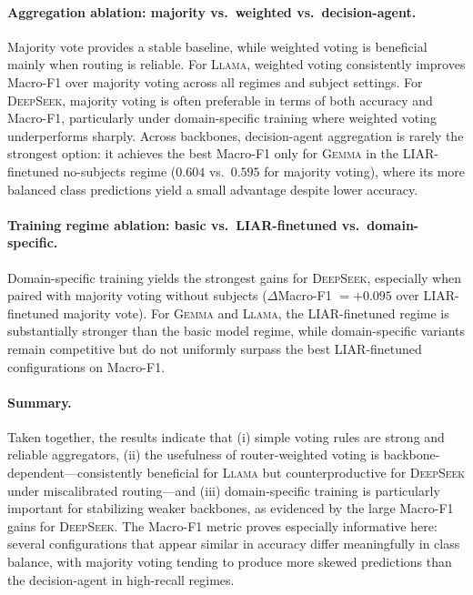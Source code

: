 \paragraph{Aggregation ablation: majority vs.\ weighted vs.\ decision-agent.}
Majority vote provides a stable baseline, while weighted voting is beneficial mainly when routing is reliable.
For \textsc{Llama}, weighted voting consistently improves Macro-F1 over majority voting across all regimes and subject settings.
For \textsc{DeepSeek}, majority voting is often preferable in terms of both accuracy and Macro-F1, particularly under domain-specific training where weighted voting underperforms sharply.
Across backbones, decision-agent aggregation is rarely the strongest option: it achieves the best Macro-F1 only for \textsc{Gemma} in the LIAR-finetuned no-subjects regime ($0.604$ vs.\ $0.595$ for majority voting), where its more balanced class predictions yield a small advantage despite lower accuracy.

\paragraph{Training regime ablation: basic vs.\ LIAR-finetuned vs.\ domain-specific.}
Domain-specific training yields the strongest gains for \textsc{DeepSeek}, especially when paired with majority voting without subjects ($\Delta$Macro-F1 $= +0.095$ over LIAR-finetuned majority vote).
For \textsc{Gemma} and \textsc{Llama}, the LIAR-finetuned regime is substantially stronger than the basic model regime, while domain-specific variants remain competitive but do not uniformly surpass the best LIAR-finetuned configurations on Macro-F1.

\paragraph{Summary.}
Taken together, the results indicate that (i) simple voting rules are strong and reliable aggregators, (ii) the usefulness of router-weighted voting is backbone-dependent---consistently beneficial for \textsc{Llama} but counterproductive for \textsc{DeepSeek} under miscalibrated routing---and (iii) domain-specific training is particularly important for stabilizing weaker backbones, as evidenced by the large Macro-F1 gains for \textsc{DeepSeek}. The Macro-F1 metric proves especially informative here: several configurations that appear similar in accuracy differ meaningfully in class balance, with majority voting tending to produce more skewed predictions than the decision-agent in high-recall regimes.

